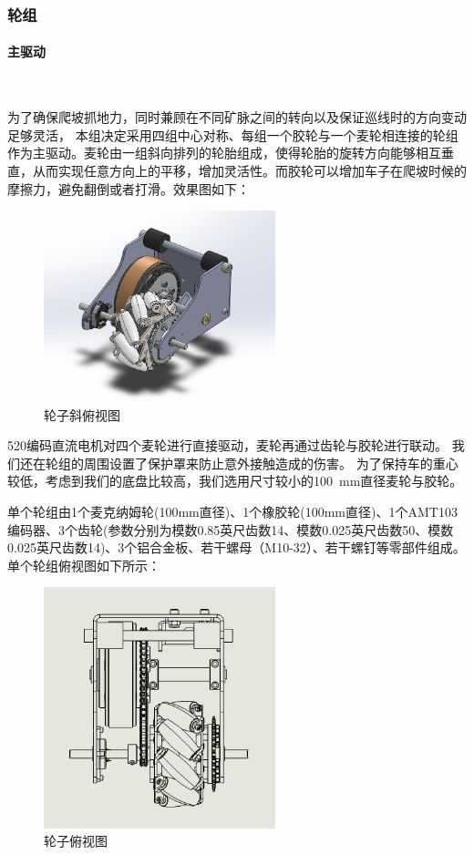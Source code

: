 \documentclass[10pt]{ctexart}
\newcommand{\subsubsubsection}[1]{\paragraph{#1}\mbox{}\\}
\begin{document}
\subsubsection{轮组}
\subsubsubsection{主驱动}
\par
为了确保爬坡抓地力，同时兼顾在不同矿脉之间的转向以及保证巡线时的方向变动足够灵活，
本组决定采用四组中心对称、每组一个胶轮与一个麦轮相连接的轮组作为主驱动。麦轮由一组斜向排列的轮胎组成，使得轮胎的旋转方向能够相互垂直，从而实现任意方向上的平移，增加灵活性。而胶轮可以增加车子在爬坡时候的摩擦力，避免翻倒或者打滑。效果图如下：
\begin{figure}[H]
    \centering
    \includegraphics[width = 0.6\textwidth]{machinery/wheel.jpg}
    \caption{轮子斜俯视图}
    \label{fig:wheel}
\end{figure}
\par
520编码直流电机对四个麦轮进行直接驱动，麦轮再通过齿轮与胶轮进行联动。
我们还在轮组的周围设置了保护罩来防止意外接触造成的伤害。
为了保持车的重心较低，考虑到我们的底盘比较高，我们选用尺寸较小的\SI{100}{\milli\meter}直径麦轮与胶轮。
\par
单个轮组由1个麦克纳姆轮(100mm直径)、1个橡胶轮(100mm直径)、1个AMT103编码器、3个齿轮(参数分别为模数0.85英尺齿数14、模数0.025英尺齿数50、模数0.025英尺齿数14)、3个铝合金板、若干螺母（M10-32）、若干螺钉等零部件组成。单个轮组俯视图如下所示：
\begin{figure}[H]
    \centering
    \includegraphics[width = 0.6\textwidth]{machinery/wheel_top.jpg}
    \caption{轮子俯视图}
    \label{fig:wheel_top}
\end{figure}
\end{document}
